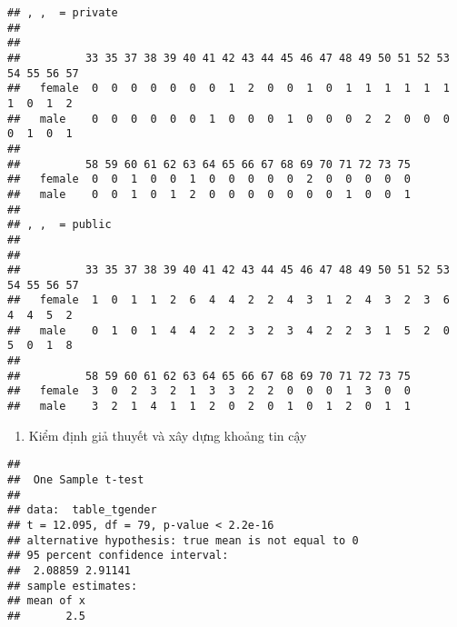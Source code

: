 \documentclass[
]{article}
\newenvironment{Shaded}{\begin{snugshade}}{\end{snugshade}}
\newcommand{\KeywordTok}[1]{\textcolor[rgb]{0.13,0.29,0.53}{\textbf{#1}}}
\newcommand{\NormalTok}[1]{#1}
\newcommand{\OperatorTok}[1]{\textcolor[rgb]{0.81,0.36,0.00}{\textbf{#1}}}
\providecommand{\tightlist}{%
  \setlength{\itemsep}{0pt}\setlength{\parskip}{0pt}}
\begin{document}
\begin{verbatim}
## , ,  = private
## 
##         
##          33 35 37 38 39 40 41 42 43 44 45 46 47 48 49 50 51 52 53 54 55 56 57
##   female  0  0  0  0  0  0  0  1  2  0  0  1  0  1  1  1  1  1  1  1  0  1  2
##   male    0  0  0  0  0  0  1  0  0  0  1  0  0  0  2  2  0  0  0  0  1  0  1
##         
##          58 59 60 61 62 63 64 65 66 67 68 69 70 71 72 73 75
##   female  0  0  1  0  0  1  0  0  0  0  0  2  0  0  0  0  0
##   male    0  0  1  0  1  2  0  0  0  0  0  0  0  1  0  0  1
## 
## , ,  = public
## 
##         
##          33 35 37 38 39 40 41 42 43 44 45 46 47 48 49 50 51 52 53 54 55 56 57
##   female  1  0  1  1  2  6  4  4  2  2  4  3  1  2  4  3  2  3  6  4  4  5  2
##   male    0  1  0  1  4  4  2  2  3  2  3  4  2  2  3  1  5  2  0  5  0  1  8
##         
##          58 59 60 61 62 63 64 65 66 67 68 69 70 71 72 73 75
##   female  3  0  2  3  2  1  3  3  2  2  0  0  0  1  3  0  0
##   male    3  2  1  4  1  1  2  0  2  0  1  0  1  2  0  1  1
\end{verbatim}

\begin{enumerate}
\def\labelenumi{\arabic{enumi}.}
\setcounter{enumi}{3}
\tightlist
\item
  Kiểm định giả thuyết và xây dựng khoảng tin cậy
\end{enumerate}

\begin{Shaded}
\end{Shaded}

\begin{verbatim}
## 
##  One Sample t-test
## 
## data:  table_tgender
## t = 12.095, df = 79, p-value < 2.2e-16
## alternative hypothesis: true mean is not equal to 0
## 95 percent confidence interval:
##  2.08859 2.91141
## sample estimates:
## mean of x 
##       2.5
\end{verbatim}

\begin{Shaded}
\end{Shaded}
\end{document}
